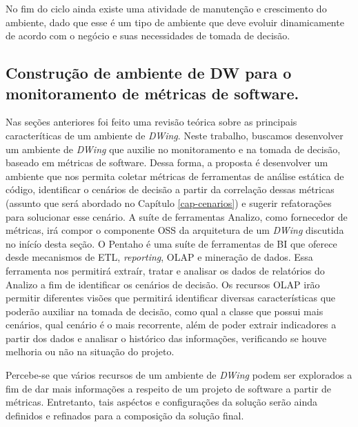 No fim do ciclo ainda existe uma atividade de manutenção e crescimento do ambiente, dado que esse é um tipo de ambiente que deve evoluir dinamicamente de acordo com o negócio e suas necessidades de tomada de decisão.


\subsection{Construção de ambiente de DW para o monitoramento de métricas de software.}

%

Nas seções anteriores foi feito uma revisão teórica sobre as principais caracteríticas de um ambiente de \emph{DWing}. Neste trabalho, buscamos desenvolver um ambiente de \emph{DWing} que auxilie no monitoramento e na tomada de decisão, baseado em métricas de software. Dessa forma, a proposta é desenvolver um ambiente que nos permita coletar métricas de ferramentas de análise estática de código, identificar o cenários de decisão a partir da correlação dessas métricas (assunto que será abordado no Capítulo \ref{cap-cenarios}) e sugerir refatorações para solucionar esse cenário. A suíte de ferramentas Analizo, como fornecedor de métricas, irá compor o componente OSS da arquitetura de um \emph{DWing} discutida no inícío desta seção. O Pentaho é uma suíte de ferramentas de BI que oferece desde mecanismos de ETL, \emph{reporting}, OLAP e mineração de dados. Essa ferramenta nos permitirá extraír, tratar e analisar os dados de relatórios do Analizo a fim de identificar os cenários de decisão. Os recursos OLAP irão permitir diferentes visões que permitirá identificar diversas características que poderão auxiliar na tomada de decisão, como qual a classe que possui mais cenários, qual cenário é o mais recorrente, além de poder extrair indicadores a partir dos dados e analisar o histórico das informações, verificando se houve melhoria ou não na situação do projeto.

Percebe-se que vários recursos de um ambiente de \emph{DWing} podem ser explorados a fim de dar mais informações a respeito de um projeto de software a partir de métricas. Entretanto, tais aspéctos e configurações da solução serão ainda  definidos e refinados para a composição da solução final.

%


